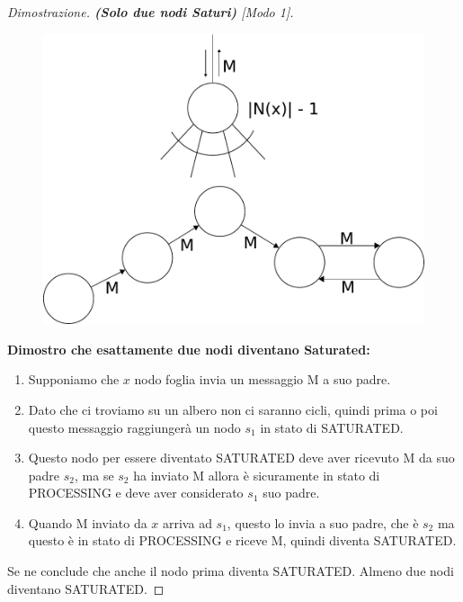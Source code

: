 \begin{proof}[Dimostrazione. \textbf{(Solo due nodi Saturi)} \textit{[Modo 1]}]\
    \begin{figure}[H]
        \centering
        \includegraphics[scale=0.5]{capitoli/saturazione/imgs/n_40}
    \end{figure}

    \textbf{Dimostro che esattamente due nodi diventano Saturated:}
    \begin{enumerate}
        \item Supponiamo che $x$ nodo foglia invia un messaggio M a suo
              padre.
        \item Dato che ci troviamo su un albero non ci saranno cicli, quindi
              prima o poi questo messaggio raggiungerà un nodo $s_1$ in stato di
              SATURATED.
        \item

              Questo nodo per essere diventato SATURATED deve aver ricevuto
              M da suo padre $s_2$, ma se $s_2$ ha inviato M allora è
              sicuramente in stato di PROCESSING e deve aver considerato
              $s_1$ suo padre.
        \item Quando M inviato da $x$ arriva ad $s_1$, questo lo invia a suo
              padre, che è $s_2$ ma questo è in stato di PROCESSING e riceve M,
              quindi diventa SATURATED.
    \end{enumerate}


    Se ne conclude che anche il nodo prima diventa SATURATED. Almeno due
    nodi diventano SATURATED.
\end{proof}

